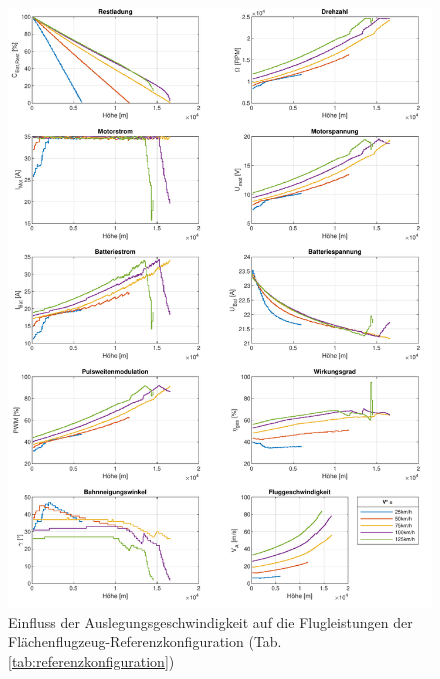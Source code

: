 \begin{figure}[H]
\centering
	\includegraphics[scale=0.7]{Diagramme/Flaechenflzg_Vstern.pdf}
	\caption{Einfluss der Auslegungsgeschwindigkeit auf die Flugleistungen der Flächenflugzeug-Referenzkonfiguration (Tab. \ref{tab:referenzkonfiguration})}
	\label{abb:vstern}
\end{figure}



